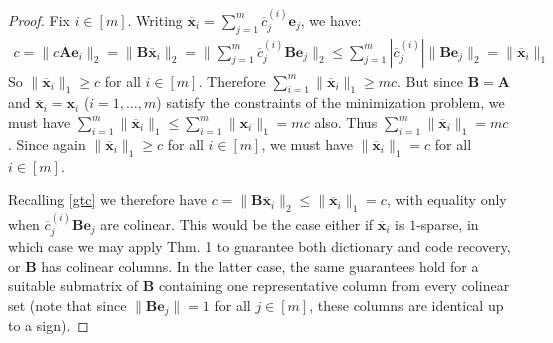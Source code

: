 \documentclass{ucbthesis}
\begin{document}
\begin{proof}
Fix $i \in [m]$. Writing $\mathbf{\overline x}_i = \sum_{j=1}^m \overline c^{(i)}_j \mathbf{e}_j$, we have:
\begin{align}\label{gtc}
c = \|c\mathbf{Ae}_i\|_2 = \|\mathbf{B \overline x}_i\|_2 = \|\sum_{j=1}^m \overline c^{(i)}_j \mathbf{Be}_j\|_2 \leq \sum_{j=1}^m |\overline c^{(i)}_j| \|\mathbf{Be}_j\|_2 = \|\mathbf{\overline x}_i\|_1
\end{align}
So $\|\mathbf{\overline x}_i\|_1 \geq c$ for all $i \in [m]$. Therefore $\sum_{i=1}^m \|\mathbf{\overline x}_i\|_1 \geq mc$. But since $\mathbf{B} = \mathbf{A}$ and $\mathbf{\overline x}_i = \mathbf{x}_i$ ($i = 1, \ldots, m$) satisfy the constraints of the minimization problem, we must have $\sum_{i=1}^m \|\mathbf{\overline x}_i\|_1 \leq \sum_{i=1}^m \|\mathbf{x}_i\|_1 = mc$ also. Thus $\sum_{i=1}^m \|\mathbf{\overline x}_i\|_1 = mc$. Since again $\|\mathbf{\overline x}_i\|_1 \geq c$ for all $i \in [m]$, we must have $\| \mathbf{\overline x}_i\|_1 = c$ for all $i \in [m]$.

Recalling \eqref{gtc} we therefore have $c = \|\mathbf{B\overline x}_i\|_2 \leq \|\mathbf{\overline x}_i\|_1 = c$, with equality only when $\overline c^{(i)}_j \mathbf{Be}_j$ are colinear. This would be the case either if $\mathbf{\overline x}_i$ is $1$-sparse, in which case we may apply 
Thm. 1
to guarantee both dictionary and code recovery, or $\mathbf{B}$ has colinear columns. In the latter case, the same guarantees hold for a suitable submatrix of $\mathbf{B}$ containing one representative column from every colinear set (note that since $\|\mathbf{Be}_j\| = 1$ for all $j \in [m]$, these columns are identical up to a sign).
\end{proof}


\end{document}
